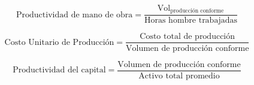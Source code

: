 \begin{equation}\label{eq:productividad_mano_obra}
    \text{Productividad de mano de obra}=\frac{\text{Vol}_{\text{producci\'on conforme}}}{\text{Horas hombre trabajadas}}
\end{equation}

\begin{equation}\label{eq:productividad_costo_unitario}
    \text{Costo Unitario de Producci\'on} = \frac{\text{Costo total de producci\'on}}{\text{Volumen de producci\'on conforme}}
\end{equation}

\begin{equation}\label{eq:productividad_capital}
    \text{Productividad del capital} = \frac{\text{Volumen de producci\'on conforme}}{\text{Activo total promedio}}
\end{equation}

